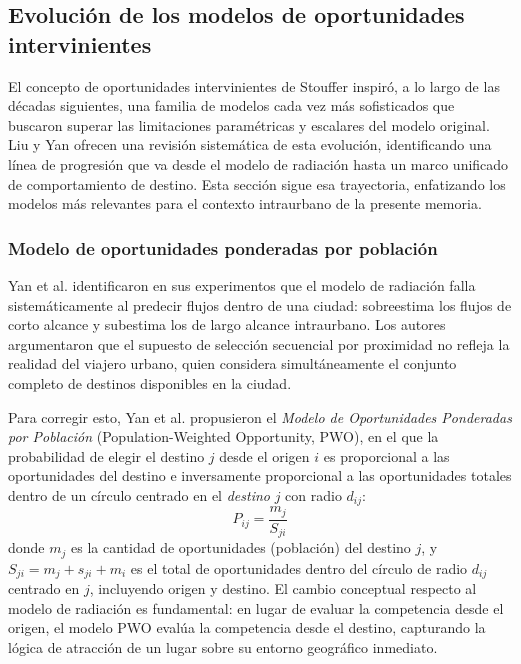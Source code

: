 \subsection{Evolución de los modelos de oportunidades intervinientes}
\label{sec:modelos_evolucion}

El concepto de oportunidades intervinientes de Stouffer \cite{stouffer1940intervening} inspiró, a lo largo de las décadas siguientes, una familia de modelos cada vez más sofisticados que buscaron superar las limitaciones paramétricas y escalares del modelo original. Liu y Yan \cite{liu2020intervening} ofrecen una revisión sistemática de esta evolución, identificando una línea de progresión que va desde el modelo de radiación hasta un marco unificado de comportamiento de destino. Esta sección sigue esa trayectoria, enfatizando los modelos más relevantes para el contexto intraurbano de la presente memoria.

\subsubsection{Modelo de oportunidades ponderadas por población}

Yan et al. \cite{yan2014population} identificaron en sus experimentos que el modelo de radiación falla sistemáticamente al predecir flujos dentro de una ciudad: sobreestima los flujos de corto alcance y subestima los de largo alcance intraurbano. Los autores argumentaron que el supuesto de selección secuencial por proximidad no refleja la realidad del viajero urbano, quien considera simultáneamente el conjunto completo de destinos disponibles en la ciudad.

Para corregir esto, Yan et al. \cite{yan2014population} propusieron el \textit{Modelo de Oportunidades Ponderadas por Población} (Population-Weighted Opportunity, PWO), en el que la probabilidad de elegir el destino $j$ desde el origen $i$ es proporcional a las oportunidades del destino e inversamente proporcional a las oportunidades totales dentro de un círculo centrado en el \emph{destino} $j$ con radio $d_{ij}$:
\begin{equation}
    P_{ij} = \frac{m_j}{S_{ji}}
    \label{eq:pwo}
\end{equation}
donde $m_j$ es la cantidad de oportunidades (población) del destino $j$, y $S_{ji} = m_j + s_{ji} + m_i$ es el total de oportunidades dentro del círculo de radio $d_{ij}$ centrado en $j$, incluyendo origen y destino. El cambio conceptual respecto al modelo de radiación es fundamental: en lugar de evaluar la competencia desde el origen, el modelo PWO evalúa la competencia desde el destino, capturando la lógica de atracción de un lugar sobre su entorno geográfico inmediato.

